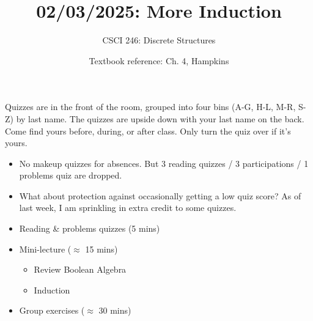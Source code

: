 \documentclass[10pt]{beamer}
\begin{document}






\title{02/03/2025: More Induction}
\author{CSCI 246: Discrete Structures}
\date{Textbook reference: Ch. 4, Hampkins}

\begin{frame}
    \titlepage 
\end{frame}


\begin{frame}
\footnotesize 

\begin{mygreenbox}[title=Graded Quiz Pickup]
Quizzes are in the front of the room, grouped into four bins (A-G, H-L, M-R, S-Z) by last name. The quizzes are upside down with your last name on the back. Come find yours before, during, or after class.  Only turn the quiz over if it's yours.
\end{mygreenbox} 
\vfill 

\begin{myredbox}[title=Review of Make Up Policy / Grading Policy]

\begin{itemize}
\item No makeup quizzes for absences.  But 3 reading quizzes / 3 participations / 1 problems quiz are dropped.  
\item What about protection against occasionally getting a low quiz score? As of last week, I am sprinkling in extra credit to some quizzes.   
\end{itemize}

\end{myredbox}

\vfill 


\begin{myyellowbox}[title=Today's Agenda]
\begin{itemize}
	\item Reading \& problems quizzes  (5 mins)
	\item Mini-lecture ($\approx$ 15 mins)
	\begin{itemize}
	\footnotesize 
	\item Review Boolean Algebra
	\item Induction 
	\end{itemize}
	\item Group exercises ($\approx$ 30 mins)
\end{itemize}

\end{myyellowbox}
\vfill 

\end{frame}
\end{document}
